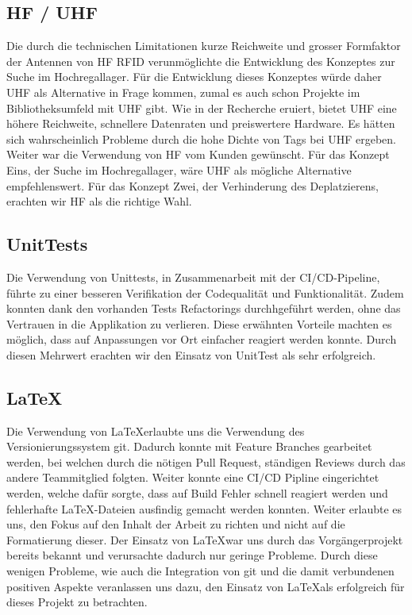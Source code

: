 \subsection{HF / UHF}
Die durch die technischen Limitationen kurze Reichweite und grosser Formfaktor der Antennen von \gls{HF} \gls{RFID} verunmöglichte die Entwicklung des Konzeptes zur Suche im Hochregallager. Für die Entwicklung dieses Konzeptes würde daher \gls{UHF} als Alternative in Frage kommen, zumal es auch schon Projekte im Bibliotheksumfeld mit \gls{UHF} gibt. Wie in der Recherche eruiert, bietet \gls{UHF} eine höhere Reichweite, schnellere Datenraten und preiswertere Hardware. Es hätten sich wahrscheinlich Probleme durch die hohe Dichte von Tags bei \gls{UHF} ergeben. Weiter war die Verwendung von \gls{HF} vom Kunden gewünscht. Für das Konzept Eins, der Suche im Hochregallager, wäre \gls{UHF} als mögliche Alternative empfehlenswert. Für das Konzept Zwei, der Verhinderung des Deplatzierens, erachten wir \gls{HF} als die richtige Wahl.

\subsection{UnitTests}
Die Verwendung von Unittests, in Zusammenarbeit mit der CI/CD-Pipeline, führte zu einer besseren Verifikation der Codequalität und Funktionalität. Zudem konnten dank den vorhanden Tests Refactorings durchhgeführt werden, ohne das Vertrauen in die Applikation zu verlieren. Diese erwähnten Vorteile machten es möglich, dass auf Anpassungen vor Ort einfacher reagiert werden konnte. Durch diesen Mehrwert erachten wir den Einsatz von UnitTest als sehr erfolgreich.

\subsection{\LaTeX}
Die Verwendung von \LaTeX erlaubte uns die Verwendung des Versionierungssystem git. Dadurch konnte mit Feature Branches gearbeitet werden, bei welchen durch die nötigen Pull Request, ständigen Reviews durch das andere Teammitglied folgten. Weiter konnte eine CI/CD Pipline eingerichtet werden, welche dafür sorgte, dass auf Build Fehler schnell reagiert werden und fehlerhafte \LaTeX-Dateien ausfindig gemacht werden konnten. Weiter erlaubte es uns, den Fokus auf den Inhalt der Arbeit zu richten und nicht auf die Formatierung dieser. Der Einsatz von \LaTeX war uns durch das Vorgängerprojekt bereits bekannt und verursachte dadurch nur geringe Probleme. Durch diese wenigen Probleme, wie auch die Integration von git und die damit verbundenen positiven Aspekte veranlassen uns dazu, den Einsatz von \LaTeX als erfolgreich für dieses Projekt zu betrachten.

